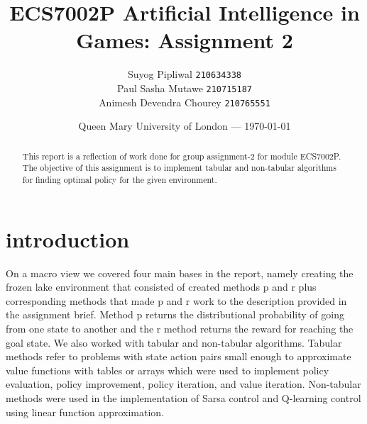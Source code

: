 \documentclass[11pt]{article}
\title{ECS7002P Artificial Intelligence in Games: Assignment 2} %
\author{Suyog Pipliwal \texttt{210634338}\\ 
			Paul Sasha Mutawe \texttt{210715187} \\ 
			Animesh Devendra Chourey \texttt{210765551}
} %
\date{Queen Mary University of London --- \today} %
\begin{document}
	\maketitle
\begin{abstract}
	This report is a reflection of work done for group assignment-2 for module ECS7002P. The objective of this assignment is to implement tabular and non-tabular algorithms for finding optimal policy for the given environment. 
\end{abstract}
\section{introduction}
	\begin{enumerate}
     On a macro view we covered four main bases in the report, namely creating the frozen lake environment that consisted of created methods p and r plus corresponding methods that made p and r work to the description provided in the assignment brief. Method p returns the distributional probability of going from one state to another and the r method returns the reward for reaching the goal state. We also worked with tabular and non-tabular algorithms. Tabular methods refer to problems with state action pairs small enough to approximate value functions with tables or arrays which were used to implement policy evaluation, policy improvement, policy iteration, and value iteration. Non-tabular methods were used in the implementation of Sarsa control and Q-learning control using linear function approximation.
	\end{enumerate}
\end{document}
